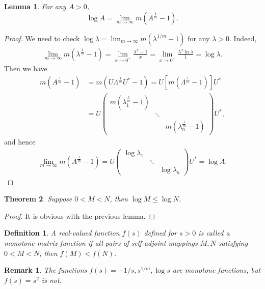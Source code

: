 \documentclass[11pt]{book}
\newtheorem{definition}{Definition}[chapter]
\newtheorem{theorem}{Theorem}[chapter]
\newtheorem{lemma}[theorem]{Lemma}
\newtheorem{remark}{Remark}[chapter]
\theoremstyle{definition}
\numberwithin{equation}{chapter}
\begin{document}
\begin{lemma}
For any $A > 0$, $$\log A = \lim_{m\to\infty} m \left(A^{\frac{1}{m}} - 1\right).$$
\end{lemma}
\begin{proof}
We need to check $\log \lambda = \lim_{m\to\infty} m \left(\lambda^{1/m} - 1\right)$ for any $\lambda > 0$. Indeed, 
\begin{align*}
    \lim_{m\to\infty} m \left(\lambda^{\frac{1}{m}} - 1\right) = \lim_{x\to 0^+} \frac{\lambda^x - 1}{x} = \lim_{x\to 0^+} \frac{\lambda^x \ln \lambda }{1} = \log \lambda. 
\end{align*}
Then we have
\begin{align*}
    m \left(A^{\frac{1}{m}} - 1\right) & = m \left( U \Lambda^{\frac{1}{m}} U^* - 1 \right) = U \left[m \left(\Lambda^{\frac{1}{m}} - 1\right)\right] U^* \\
    & = U \begin{pmatrix}
        m \left(\lambda_1^{\frac{1}{m}} - 1\right) &  & \\
        & \ddots & \\
        &  & m \left(\lambda_n^{\frac{1}{m}} - 1\right)
    \end{pmatrix} U^*,
\end{align*}
and hence 
\begin{align*}
    \lim_{m\to\infty} m \left(A^{\frac{1}{m}} - 1\right) = U \begin{pmatrix}
        \log \lambda_1 &  & \\
        & \ddots & \\
        &  & \log \lambda_n
    \end{pmatrix} U^* = \log A.
\end{align*}
\end{proof}

\medskip

\begin{theorem}
Suppose $0 < M < N$, then $\log M \leq \log N$.
\end{theorem}
\begin{proof}
It is obvious with the previous lemma.
\end{proof}

\medskip

\begin{definition}
A real-valued function $f(s)$ defined for $s > 0$ is called a monotone matrix function if all pairs of self-adjoint mappings $M, N$ satisfying $0 < M < N$, then $f(M) < f(N)$. 
\end{definition}
\begin{remark}
The functions $f(s) = - 1/s, s^{1/m}, \log s$ are monotone functions, but $f(s) = s^2$ is not.
\end{remark}
\end{document}
